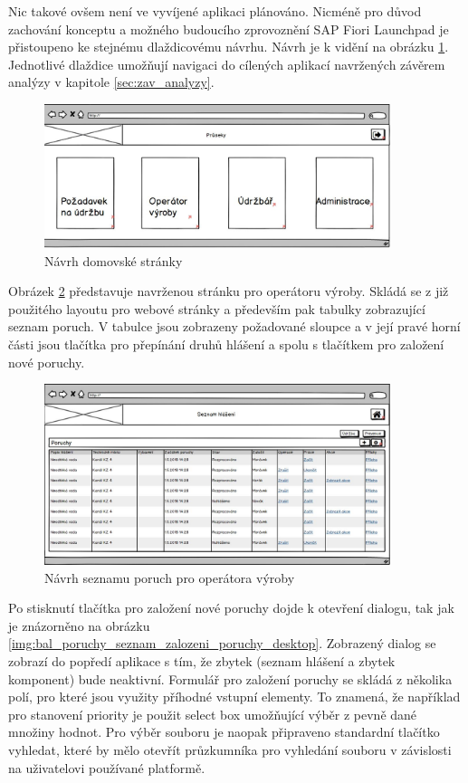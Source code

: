 \documentclass[thesis=M,czech]{FITthesis}[2012/06/26]
\begin{document}
Nic takové ovšem není ve vyvíjené aplikaci plánováno. Nicméně pro důvod zachování konceptu a možného budoucího zprovoznění SAP Fiori Launchpad je přistoupeno ke stejnému dlaždicovému návrhu. Návrh je k vidění na obrázku \ref{img:bal_homepage_desktop}. Jednotlivé dlaždice umožňují navigaci do cílených aplikací navržených závěrem analýzy v kapitole \ref{sec:zav_analyzy}.
\begin{figure}[H]
	\centering
	\includegraphics[width=0.9\textwidth]{images/bal_homepage}
	\caption{Návrh domovské stránky}
	\label{img:bal_homepage_desktop}
\end{figure}
Obrázek \ref{img:bal_poruchy_seznam_desktop} představuje navrženou stránku pro operátoru výroby. Skládá se z již použitého layoutu pro webové stránky a především pak tabulky zobrazující seznam poruch. V tabulce jsou zobrazeny požadované sloupce a v její pravé horní části jsou tlačítka pro přepínání druhů hlášení a spolu s tlačítkem pro založení nové poruchy. 
\begin{figure}[H]
	\centering
	\includegraphics[width=0.9\textwidth]{images/bal_poruchy_seznam}
	\caption{Návrh seznamu poruch pro operátora výroby}
	\label{img:bal_poruchy_seznam_desktop}
\end{figure}
Po stisknutí tlačítka pro založení nové poruchy dojde k otevření dialogu, tak jak je znázorněno na obrázku \ref{img:bal_poruchy_seznam_zalozeni_poruchy_desktop}. Zobrazený dialog se zobrazí do popředí aplikace s tím, že zbytek (seznam hlášení a zbytek komponent) bude neaktivní. Formulář pro založení poruchy se skládá z několika polí, pro které jsou využity příhodné vstupní elementy. To znamená, že například pro stanovení priority je použit select box umožňující výběr z pevně dané množiny hodnot. Pro výběr souboru je naopak připraveno standardní tlačítko vyhledat, které by mělo otevřít průzkumníka pro vyhledání souboru v závislosti na uživatelovi používané platformě. 
\end{document}
